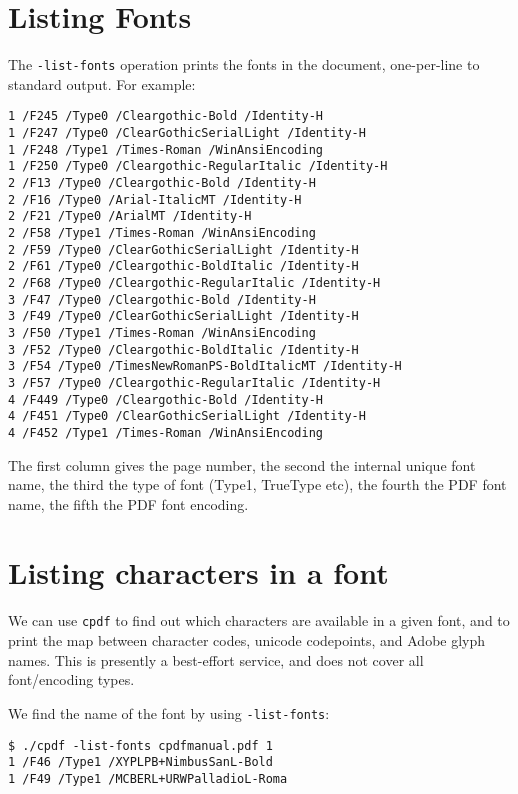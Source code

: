 \documentclass{book}
\begin{document}
\section{Listing Fonts}

\label{listingfonts}
  The \texttt{-list-fonts} operation prints the fonts in the document,
one-per-line to standard output. For example:
\begin{framed}\small\begin{verbatim}1 /F245 /Type0 /Cleargothic-Bold /Identity-H
1 /F247 /Type0 /ClearGothicSerialLight /Identity-H
1 /F248 /Type1 /Times-Roman /WinAnsiEncoding
1 /F250 /Type0 /Cleargothic-RegularItalic /Identity-H
2 /F13 /Type0 /Cleargothic-Bold /Identity-H
2 /F16 /Type0 /Arial-ItalicMT /Identity-H
2 /F21 /Type0 /ArialMT /Identity-H
2 /F58 /Type1 /Times-Roman /WinAnsiEncoding
2 /F59 /Type0 /ClearGothicSerialLight /Identity-H
2 /F61 /Type0 /Cleargothic-BoldItalic /Identity-H
2 /F68 /Type0 /Cleargothic-RegularItalic /Identity-H
3 /F47 /Type0 /Cleargothic-Bold /Identity-H
3 /F49 /Type0 /ClearGothicSerialLight /Identity-H
3 /F50 /Type1 /Times-Roman /WinAnsiEncoding
3 /F52 /Type0 /Cleargothic-BoldItalic /Identity-H
3 /F54 /Type0 /TimesNewRomanPS-BoldItalicMT /Identity-H
3 /F57 /Type0 /Cleargothic-RegularItalic /Identity-H
4 /F449 /Type0 /Cleargothic-Bold /Identity-H
4 /F451 /Type0 /ClearGothicSerialLight /Identity-H
4 /F452 /Type1 /Times-Roman /WinAnsiEncoding
\end{verbatim}
\end{framed}

\noindent The first column gives the page number, the second the internal unique font
name, the third the type of font (Type1, TrueType etc), the fourth the PDF font
name, the fifth the PDF font encoding.

\section{Listing characters in a font}

We can use \texttt{cpdf} to find out which characters are available in a given font, and to print the map between character codes, unicode codepoints, and Adobe glyph names. This is presently a best-effort service, and does not cover all font/encoding types.

We find the name of the font by using \texttt{-list-fonts}:

{\small\begin{verbatim}
$ ./cpdf -list-fonts cpdfmanual.pdf 1
1 /F46 /Type1 /XYPLPB+NimbusSanL-Bold 
1 /F49 /Type1 /MCBERL+URWPalladioL-Roma 
\end{verbatim}}
\end{document}
